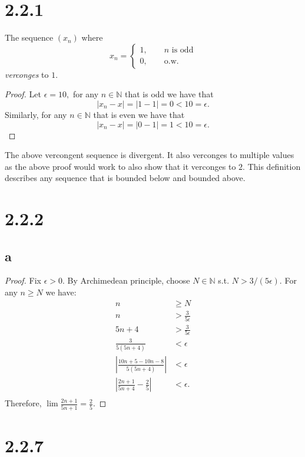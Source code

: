 \documentclass[10pt]{article}
\begin{document}
\section*{2.2.1}
The sequence $(x_n)$ where %
\begin{equation*}
    x_n = \begin{cases}
        1,\qquad\text{$n$ is odd}\\
        0,\qquad\text{o.w.}
    \end{cases}
\end{equation*}
\textit{verconges} to $1.$ 
\begin{proof}
    Let $\epsilon=10,$ for any $n\in\mathbb{N}$ that is odd we have that
    \[|x_n-x|=|1-1|=0<10=\epsilon.\]
    Similarly, for any $n\in\mathbb{N}$ that is even we have that
    \[|x_n-x|=|0-1|=1<10=\epsilon.\]
\end{proof}
 The above vercongent sequence is divergent. It also verconges to multiple values as the above proof would work to also show that it verconges to $2.$ This definition describes any sequence that is bounded below and bounded above.

 \section*{2.2.2}
 \subsection*{a}
 \begin{proof}
    Fix $\epsilon>0.$ By Archimedean principle, choose $N\in\mathbb{N}$ s.t. $N>3/(5\epsilon).$ For any $n\ge N$ we have:
    \begin{align*}
        n &\ge N\\
        n &>\frac{3}{5\epsilon}\\
        5n+4  &>\frac{3}{5\epsilon}\\
        \frac{3}{5(5n+4)} &< \epsilon\\
        \left |\frac{10n+5-10n-8}{5(5n+4)} \right | &<\epsilon\\
        \left |\frac{2n+1}{5n+4}-\frac{2}{5} \right | &< \epsilon.\\
    \end{align*}
    Therefore, $\lim \frac{2n+1}{5n+1} = \frac{2}{5}.$
 \end{proof}

 \section*{2.2.7}
\end{document}
